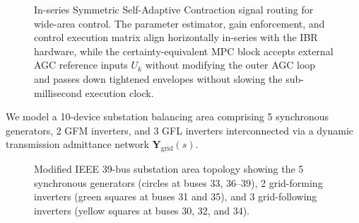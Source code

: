 \documentclass[journal]{IEEEtran}
\begin{document}
\begin{figure}[!t]
\caption{In-series Symmetric Self-Adaptive Contraction signal routing for wide-area control. The parameter estimator, gain enforcement, and control execution matrix align horizontally in-series with the IBR hardware, while the certainty-equivalent MPC block accepts external AGC reference inputs $U_k$ without modifying the outer AGC loop and passes down tightened envelopes without slowing the sub-millisecond execution clock.}
\label{fig:area_block_diagram}
\end{figure}

We model a 10-device substation balancing area comprising 5 synchronous generators, 2 GFM inverters, and 3 GFL inverters interconnected via a dynamic transmission admittance network $\bm{Y}_{\text{grid}}(s)$.

\begin{figure}[!t]
\centering

\caption{Modified IEEE 39-bus substation area topology showing the 5 synchronous generators (circles at buses 33, 36--39), 2 grid-forming inverters (green squares at buses 31 and 35), and 3 grid-following inverters (yellow squares at buses 30, 32, and 34).}
\label{fig:ieee39_topology}
\end{figure}
\end{document}

